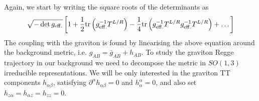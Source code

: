 \documentclass[a4paper,12pt]{article}
\begin{document}
Again, we start by writing the square roots of the determinants as
\begin{align}
	\sqrt{-\det g_{\rm{eff.}}} \left[ 1 + \frac{1}{2} \text{tr} \left( g^{-1}_{\rm{eff.}} T^{L/R}\right) - \frac{1}{4} \text{tr} \left( g^{-1}_{\rm{eff.}} T^{L/R} g^{-1}_{\rm{eff.}} T^{L/R} \right) + \dots \right]
\end{align}
The coupling with the graviton is found by linearising the above equation around the background metric, i.e. $g_{AB} = \bar{g}_{AB} + h_{AB}$. 
To study the graviton Regge trajectory in our background we need to decompose the metric in $SO(1,3)$ irreducible representations. 
We will be only interested in the graviton TT components $h_{\alpha \beta}$, satisfying $\partial^\alpha h_{\alpha \beta} = 0$ and $h^\alpha_\alpha = 0$, and also set $h_{z \alpha} = h_{\alpha z} = h_{zz} = 0$.
\end{document}
